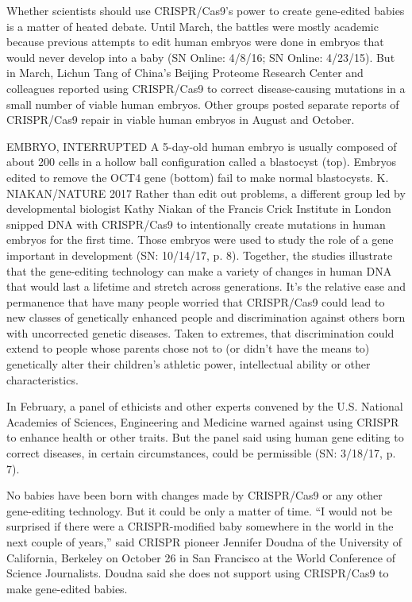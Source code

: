 \documentclass[12pt]{article}
\begin{document}
Whether scientists should use CRISPR/Cas9’s power to create gene-edited babies is a matter of heated debate. Until March, the battles were mostly academic because previous attempts to edit human embryos were done in embryos that would never develop into a baby (SN Online: 4/8/16; SN Online: 4/23/15). But in March, Lichun Tang of China’s Beijing Proteome Research Center and colleagues reported using CRISPR/Cas9 to correct disease-causing mutations in a small number of viable human embryos. Other groups posted separate reports of CRISPR/Cas9 repair in viable human embryos in August and October.


EMBRYO, INTERRUPTED A 5-day-old human embryo is usually composed of about 200 cells in a hollow ball configuration called a blastocyst (top). Embryos edited to remove the OCT4 gene (bottom) fail to make normal blastocysts.
K. NIAKAN/NATURE 2017
Rather than edit out problems, a different group led by developmental biologist Kathy Niakan of the Francis Crick Institute in London snipped DNA with CRISPR/Cas9 to intentionally create mutations in human embryos for the first time. Those embryos were used to study the role of a gene important in development (SN: 10/14/17, p. 8).
Together, the studies illustrate that the gene-editing technology can make a variety of changes in human DNA that would last a lifetime and stretch across generations. It’s the relative ease and permanence that have many people worried that CRISPR/Cas9 could lead to new classes of genetically enhanced people and discrimination against others born with uncorrected genetic diseases. Taken to extremes, that discrimination could extend to people whose parents chose not to (or didn’t have the means to) genetically alter their children’s athletic power, intellectual ability or other characteristics.

In February, a panel of ethicists and other experts convened by the U.S. National Academies of Sciences, Engineering and Medicine warned against using CRISPR to enhance health or other traits. But the panel said using human gene editing to correct diseases, in certain circumstances, could be permissible (SN: 3/18/17, p. 7).

No babies have been born with changes made by CRISPR/Cas9 or any other gene-editing technology. But it could be only a matter of time. “I would not be surprised if there were a CRISPR-modified baby somewhere in the world in the next couple of years,” said CRISPR pioneer Jennifer Doudna of the University of California, Berkeley on October 26 in San Francisco at the World Conference of Science Journalists. Doudna said she does not support using CRISPR/Cas9 to make gene-edited babies.
\end{document}
